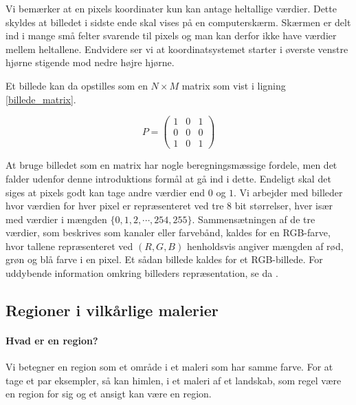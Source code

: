 {Vi bemærker at en pixels koordinater kun kan antage heltallige værdier.
Dette skyldes at billedet i sidste ende skal vises på en computerskærm.
Skærmen er delt ind i mange små felter svarende til pixels og man kan
derfor ikke have værdier mellem heltallene.  Endvidere ser vi at
koordinatsystemet starter i øverste venstre hjørne stigende mod nedre
højre hjørne.

Et billede kan da opstilles som en $N \times M$ matrix som vist i
ligning \ref{billede_matrix}.

\begin{equation}
    P = \left ( \begin{array}{ccc}
        1 & 0 & 1 \\
        0 & 0 & 0 \\
        1 & 0 & 1
    \end{array} \right )
    \label{billede_matrix}
\end{equation}

At bruge billedet som en matrix har nogle beregningsmæssige fordele, men
det falder udenfor denne introduktions formål at gå ind i dette.
Endeligt skal det siges at pixels godt kan tage andre værdier end $0$ og
$1$. Vi arbejder med billeder hvor værdien for hver pixel er
repræsenteret ved tre 8 bit størrelser, hver især med værdier i mængden
$\{0, 1, 2, \cdots, 254, 255\}$. Sammensætningen af de tre værdier, som
beskrives som kanaler eller farvebånd, kaldes for en RGB-farve, hvor
tallene repræsenteret ved $(R,G,B)$ henholdsvis angiver mængden af rød,
grøn og blå farve i en pixel. Et sådan billede kaldes for et
RGB-billede. For uddybende information omkring billeders repræsentation,
se da \cite{SIOlsen}.

\subsection{Regioner i vilkårlige malerier}
\paragraph{Hvad er en region?}
Vi betegner en region som et område i et maleri som har samme farve.
For at tage et par eksempler, så kan himlen, i et maleri af et landskab,
som regel være en region for sig og et ansigt kan være en region.

}
